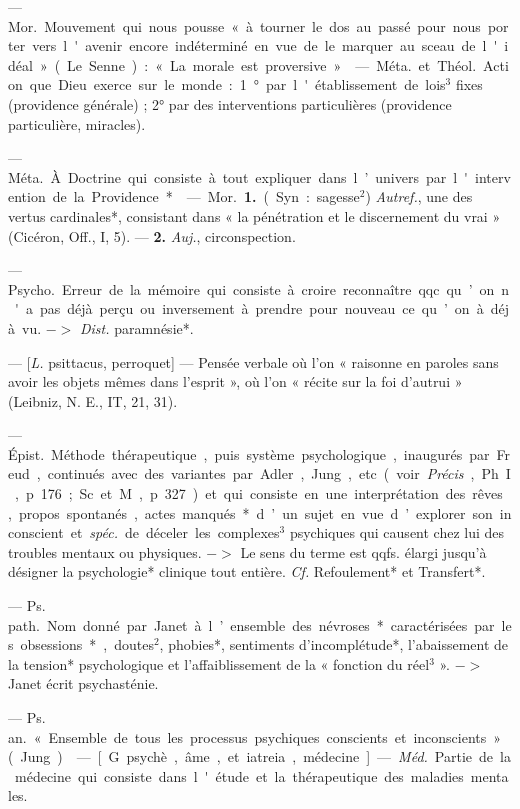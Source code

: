 \begin{itemize}[leftmargin=1cm, label=, itemsep=1pt]
 — \si{Mor.} Mouvement qui
nous pousse « à tourner le dos au
passé pour nous porter vers l'avenir
encore indéterminé en vue de le
marquer au sceau de l'idéal » (Le
Senne) : « La morale est proversive ».

 — \si{Méta.} et \si{Théol.} Action
que Dieu exerce sur le monde : 1° par
l'établissement de lois$^3$ fixes (providence générale) ; 2° par des interventions particulières (providence
particulière, miracles).

 — \si{Méta.} À. Doctrine qui consiste à tout expliquer
dans l’univers par l'intervention de
la Providence*.

 — \si{Mor.} {\bf 1.} (Syn. : sagesse$^2$)
{\it Autref.}, une des vertus cardinales*,
consistant dans « la pénétration et
le discernement du vrai » (Cicéron,
Off., I, 5). — {\bf 2.} {\it Auj.}, circonspection.

 — \si{Psycho.} Erreur de
la mémoire qui consiste à croire
reconnaître qqc. qu’on n'a pas déjà
perçu ou inversement à prendre
pour nouveau ce qu’on à déjà vu.
$->$ {\it Dist.} paramnésie*.

 — [{\it L.} psittacus, perroquet]
— Pensée verbale où l’on « raisonne
en paroles sans avoir les objets
mêmes dans l’esprit », où l’on « récite
sur la foi d'autrui » (Leibniz, N. E.,
IT, 21, 31).

 — \si{Épist.} Méthode thérapeutique, puis système psychologique, inaugurés par Freud, continués avec des variantes par Adler,
Jung, etc. (voir {\it Précis}, Ph. I, p. 176 ;
Sc. et M., p. 327) et qui consiste
en une interprétation des rêves,
propos spontanés, actes manqués*
d’un sujet en vue d’explorer son
inconscient et {\it spéc.} de déceler les
complexes$^3$ psychiques qui causent
chez lui des troubles mentaux ou
physiques. $->$ Le sens du terme
est qqfs. élargi jusqu’à désigner la
psychologie* clinique tout entière.
{\it Cf.} Refoulement* et Transfert*.

 — \si{Ps. path.} Nom
donné par Janet à l’ensemble des
névroses* caractérisées par les obsessions*, doutes$^2$, phobies*, sentiments
d’incomplétude*, l’abaissement de
la tension* psychologique et l’affaiblissement de la « fonction du réel$^3$ ».
$->$ Janet écrit psychasténie.

 — \si{Ps. an.} « Ensemble de tous
les processus psychiques conscients
et inconscients » (Jung).

 — [G. psychè, âme, et iatreia,
médecine] — \si{{\it Méd.}} Partie de la
médecine qui consiste dans l'étude
et la thérapeutique des maladies
mentales.


\end{itemize}

